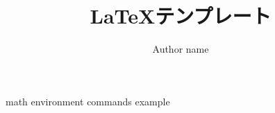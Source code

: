 \documentclass[a4paper,11pt]{ltjreport}
\title{\LaTeX テンプレート}
\author{Author name}
\date{\the\year}
\begin{document}
\maketitle
\tableofcontents

{math}
{environment}
{commands}
{example}
\end{document}
